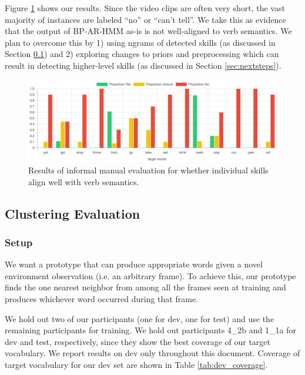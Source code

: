 \documentclass[11pt]{article}
\begin{document}
Figure \ref{fig:human-eval} shows our results. Since the video clips are often very short, the vast majority of instances are labeled ``no'' or ``can't tell''. We take this as evidence that the output of BP-AR-HMM as-is is not well-aligned to verb semantics. We plan to overcome this by 1) using ngrams of detected skills (as discussed in Section \ref{sec:clustering}) and 2) exploring changes to priors and preprocessing which can result in detecting higher-level skills (as discussed in Section \ref{sec:nextsteps}).

\begin{figure}[ht!]
\centering
\includegraphics[width=\linewidth]{figures/human_eval}
\caption{Results of informal manual evaluation for whether individual skills align well with verb semantics.}
\label{fig:human-eval}
\end{figure}

\subsection{Clustering Evaluation}
\label{sec:clustering}

\subsubsection{Setup}

We want a prototype that can produce appropriate words given a novel environment observation (i.e. an arbitrary frame). To achieve this, our prototype finds the one nearest neighbor from among all the frames seen at training and produces whichever word occurred during that frame. 

We hold out two of our participants (one for dev, one for test) and use the remaining participants for training. We hold out participants 4\_2b and 1\_1a for dev and test, respectively, since they show the best coverage of our target vocabulary. We report results on dev only throughout this document. Coverage of target vocabulary for our dev set are shown in Table \ref{tab:dev_coverage}. 
\end{document}
